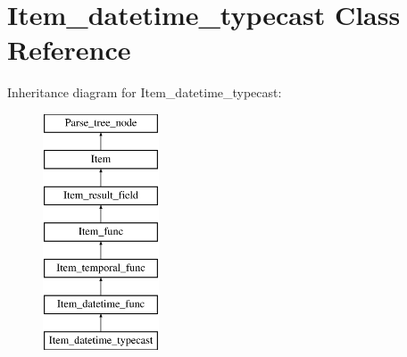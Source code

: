 \hypertarget{classItem__datetime__typecast}{}\section{Item\+\_\+datetime\+\_\+typecast Class Reference}
\label{classItem__datetime__typecast}
Inheritance diagram for Item\+\_\+datetime\+\_\+typecast\+:\begin{figure}[H]
\begin{center}
\leavevmode
\includegraphics[height=7.000000cm]{classItem__datetime__typecast}
\end{center}
\end{figure}
